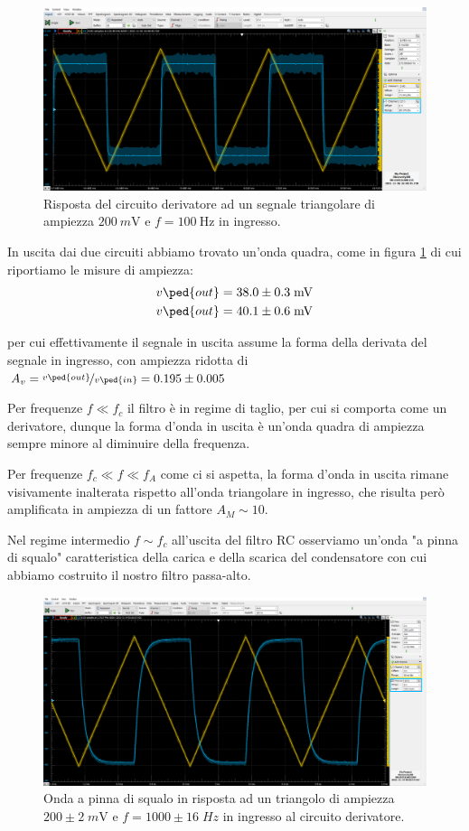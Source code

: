 \documentclass[10pt,a4paper]{article}
\begin{document}
\begin{figure}[htbp]
\centering
\includegraphics[scale=0.4]{derivatore}
\caption{Risposta del circuito derivatore ad un segnale triangolare di ampiezza
$\SI{200}{m\V}$ e $f = \SI{100}{\Hz}$ in ingresso. \label{fig: dertrg}}
\end{figure}

In uscita dai due circuiti abbiamo trovato un'onda quadra, come in figura
\ref{fig: dertrg} di cui riportiamo le misure di ampiezza:
\begin{align*}
v\ped{out} &= 38.0 \pm 0.3 \; \si{m\V} \\
v\ped{out} &= 40.1 \pm 0.6 \; \si{m\V} 
\end{align*}

per cui effettivamente il segnale in uscita assume la forma della derivata
del segnale in ingresso, con ampiezza ridotta di
$A_v = \nicefrac{v\ped{out}}{v\ped{in}} = 0.195 \pm 0.005 $

Per frequenze $f \ll f_c$ il filtro è in regime di taglio, per cui si comporta
come un derivatore, dunque la forma d'onda in uscita è un'onda quadra di
ampiezza sempre minore al diminuire della frequenza.

Per frequenze $f_c \ll f \ll f_A$ come ci si aspetta, la forma d'onda in uscita
rimane visivamente inalterata rispetto all'onda triangolare in ingresso,
che risulta però amplificata in ampiezza di un fattore $A_M \sim 10$.

Nel regime intermedio $f \sim f_c$ all'uscita del filtro RC osserviamo un'onda
"a pinna di squalo" caratteristica della carica e della scarica del
condensatore con cui abbiamo costruito il nostro filtro passa-alto.
\begin{figure}[htbp]
\centering
\includegraphics[scale=0.335]{derfin}
\caption{Onda a pinna di squalo in risposta ad un triangolo di ampiezza
$200 \pm 2 \; \si{m\V}$ e $f = 1000 \pm 16 \; \si{Hz}$ in ingresso al
circuito derivatore. \label{fig: derfin}}
\end{figure}
\end{document}
